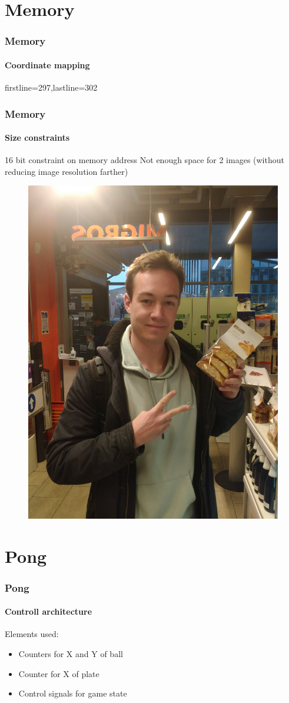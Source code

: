 \documentclass{beamer}
\begin{document}
\section{Memory}
\begin{frame}
    \sectionpage
\end{frame}

\begin{frame}[fragile]
    \frametitle{Memory}
    \framesubtitle{Coordinate mapping}
    
    firstline=297,lastline=302

\end{frame}



\begin{frame}
    \frametitle{Memory}
    \framesubtitle{Size constraints}
    \begin{alertblock}
        {16 bit constraint on memory address}
        Not enough space for 2 images (without reducing image resolution farther)
    \end{alertblock}
    \begin{figure}
        \includegraphics[width=.3\textwidth]{../_00FINAL_PROJECT/src/mandelbrot_und_so.jpg}
    \end{figure}
\end{frame}


\section{Pong}
\begin{frame}
    \sectionpage
\end{frame}

\begin{frame}
    \frametitle{Pong}
    \framesubtitle{Controll architecture}
    Elements used:
    \begin{itemize}
        \item Counters for X and Y of ball
        \item Counter for X of plate
        \item Control signals for game state
    \end{itemize}



\end{frame}
\end{document}
